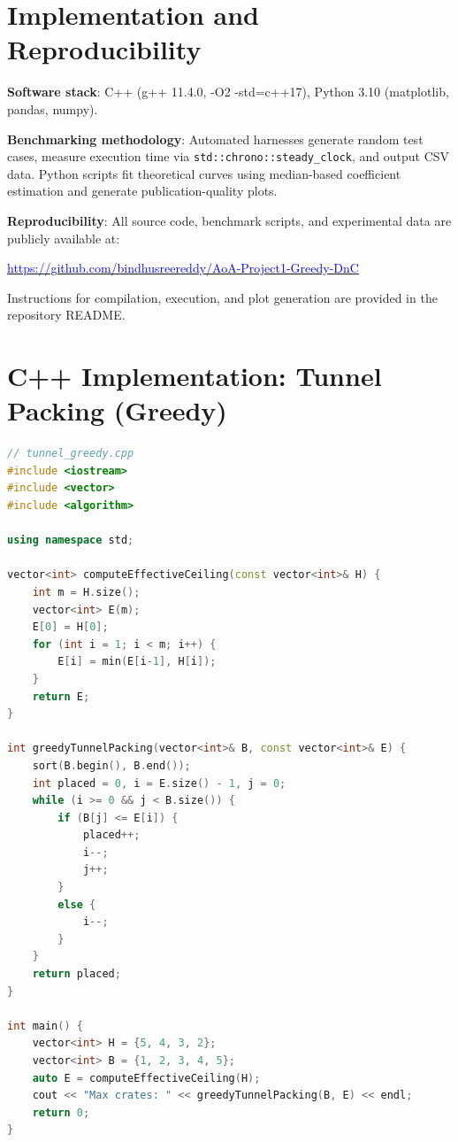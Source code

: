 \documentclass[sigconf]{acmart}
\begin{document}
\section{Implementation and Reproducibility}
\label{sec:implementation}

\textbf{Software stack}: C++ (g++ 11.4.0, -O2 -std=c++17), Python 3.10 (matplotlib, pandas, numpy).

\textbf{Benchmarking methodology}: Automated harnesses generate random test cases, measure execution time via \texttt{std::chrono::steady\_clock}, and output CSV data. Python scripts fit theoretical curves using median-based coefficient estimation and generate publication-quality plots.

\textbf{Reproducibility}: All source code, benchmark scripts, and experimental data are publicly available at:

\begin{center}
\href{https://github.com/bindhusreereddy/AoA-Project1-Greedy-DnC}{\textcolor{blue}{https://github.com/bindhusreereddy/AoA-Project1-Greedy-DnC}}
\end{center}

Instructions for compilation, execution, and plot generation are provided in the repository README.

\appendix

\section{C++ Implementation: Tunnel Packing (Greedy)}
\label{app:greedy-code}

\begin{lstlisting}[language=C++]
// tunnel_greedy.cpp
#include <iostream>
#include <vector>
#include <algorithm>

using namespace std;

vector<int> computeEffectiveCeiling(const vector<int>& H) {
    int m = H.size();
    vector<int> E(m);
    E[0] = H[0];
    for (int i = 1; i < m; i++) {
        E[i] = min(E[i-1], H[i]);
    }
    return E;
}

int greedyTunnelPacking(vector<int>& B, const vector<int>& E) {
    sort(B.begin(), B.end());
    int placed = 0, i = E.size() - 1, j = 0;
    while (i >= 0 && j < B.size()) {
        if (B[j] <= E[i]) { 
            placed++; 
            i--; 
            j++; 
        }
        else { 
            i--; 
        }
    }
    return placed;
}

int main() {
    vector<int> H = {5, 4, 3, 2};
    vector<int> B = {1, 2, 3, 4, 5};
    auto E = computeEffectiveCeiling(H);
    cout << "Max crates: " << greedyTunnelPacking(B, E) << endl;
    return 0;
}
\end{lstlisting}
\end{document}
